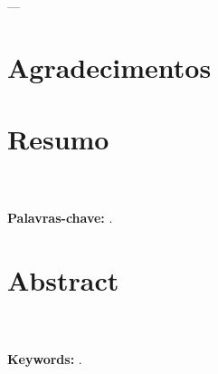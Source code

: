 \newpage 
	
\rec \\
\vspace{120mm}
\begin{flushright}
	\begin{minipage}{70mm}
		\asp{\emph{\citacao}}
		\begin{flushright}
			--- \autorcitacao
		\end{flushright}
	\end{minipage}
\end{flushright}

\chapter{Agradecimentos}
	
	\agradecimentos

\chapter{Resumo}
	\resumo \\
	\\
	\rec \textbf{Palavras-chave:} \palavraschave.
%

\newpage

\chapter{Abstract}

	\abstract \\
	\\
	\rec \textbf{Keywords:} \keywords.
%